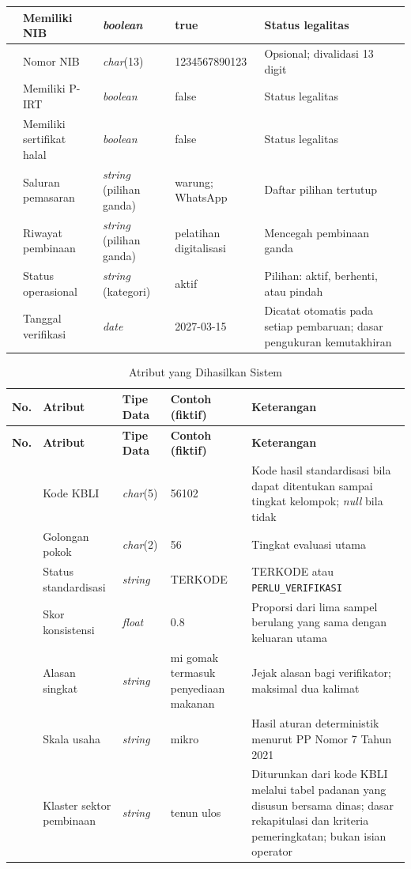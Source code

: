 {\begin{longtable}{|>{\centering\arraybackslash}p{}|L{0.19\textwidth}|L{0.12\textwidth}|L{0.21\textwidth}|L{0.32\textwidth}|}
12 & Memiliki NIB & \textit{boolean} & true & Status legalitas \\  & Nomor NIB & \textit{char}(13) & 1234567890123 & Opsional; divalidasi 13 digit \\  & Memiliki P-IRT & \textit{boolean} & false & Status legalitas \\  & Memiliki sertifikat halal & \textit{boolean} & false & Status legalitas \\  & Saluran pemasaran & \textit{string} (pilihan ganda) & warung; WhatsApp & Daftar pilihan tertutup \\  & Riwayat pembinaan & \textit{string} (pilihan ganda) & pelatihan digitalisasi & Mencegah pembinaan ganda \\  & Status operasional & \textit{string} (kategori) & aktif & Pilihan: aktif, berhenti, atau pindah \\  & Tanggal verifikasi & \textit{date} & 2027-03-15 & Dicatat otomatis pada setiap pembaruan; dasar pengukuran kemutakhiran \\ \hline
\end{longtable}
}

{\footnotesize
\setlength{\tabcolsep}{4pt}
\renewcommand{\arraystretch}{1.15}
\begin{longtable}{|>{\centering\arraybackslash}p{}|L{0.19\textwidth}|L{0.12\textwidth}|L{0.21\textwidth}|L{0.32\textwidth}|}
\caption{Atribut yang Dihasilkan Sistem}
\label{tab:atribut-sistem}\\
\hline
\textbf{No.} & \textbf{Atribut} & \textbf{Tipe Data} & \textbf{Contoh (fiktif)} & \textbf{Keterangan} \\ \hline
\endfirsthead
\hline
\textbf{No.} & \textbf{Atribut} & \textbf{Tipe Data} & \textbf{Contoh (fiktif)} & \textbf{Keterangan} \\ \hline
{} & Kode KBLI & \textit{char}(5) & 56102 & Kode hasil standardisasi bila dapat ditentukan sampai tingkat kelompok; \textit{null} bila tidak \\  & Golongan pokok & \textit{char}(2) & 56 & Tingkat evaluasi utama \\  & Status standardisasi & \textit{string} & TERKODE & TERKODE atau \texttt{PERLU\_VERIFIKASI} \\  & Skor konsistensi & \textit{float} & 0.8 & Proporsi dari lima sampel berulang yang sama dengan keluaran utama \\  & Alasan singkat & \textit{string} & mi gomak termasuk penyediaan makanan & Jejak alasan bagi verifikator; maksimal dua kalimat \\  & Skala usaha & \textit{string} & mikro & Hasil aturan deterministik menurut PP Nomor 7 Tahun 2021 \\  & Klaster sektor pembinaan & \textit{string} & tenun ulos & Diturunkan dari kode KBLI melalui tabel padanan yang disusun bersama dinas; dasar rekapitulasi dan kriteria pemeringkatan; bukan isian operator \\ \hline
\end{longtable}
}

